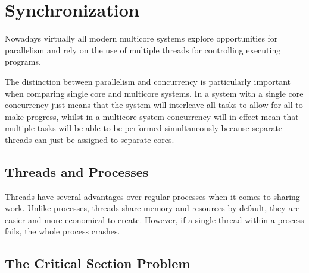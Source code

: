 \section{Synchronization}

\par{Nowadays virtually all modern multicore systems explore opportunities for parallelism and rely on the use of multiple threads for controlling executing programs.}



\par{The distinction between parallelism and concurrency is particularly important when comparing single core and multicore systems. In a system with a single core concurrency just means that the system will interleave all tasks to allow for all to make progress, whilst in a multicore system concurrency will in effect mean that multiple tasks will be able to be performed simultaneously because separate threads can just be assigned to separate cores.}

\subsection{Threads and Processes}


	\par{Threads have several advantages over regular processes when it comes to sharing work. Unlike processes, threads share memory and resources by default, they are easier and more economical to create. However, if a single thread within a process fails, the whole process crashes.}



\subsection{The Critical Section Problem}

